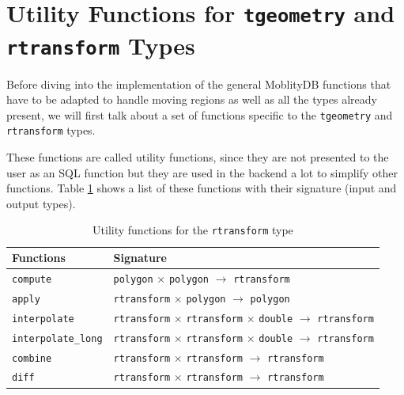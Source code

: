 
\section{Utility Functions for \texttt{tgeometry} and \texttt{rtransform} Types}
\label{section:utility_rtransform}

Before diving into the implementation of the general MoblityDB functions that have to be adapted to handle moving regions as well as all the types already present, we will first talk about a set of functions specific to the \lstinline{tgeometry} and \lstinline{rtransform} types.

These functions are called utility functions, since they are not presented to the user as an SQL function but they are used in the backend a lot to simplify other functions. Table \ref{table:rtransform_functions} shows a list of these functions with their signature (input and output types).

\begin{table}[h!]
    \centering
    \begin{tabular}[c]{|l|l|} 
    \hline
    \textbf{Functions}  & \textbf{Signature} \\ 
    \hline
    \lstinline+compute+ & \lstinline+polygon+ $\times$ \lstinline+polygon+ $\rightarrow$ \lstinline+rtransform+ \\
    \lstinline+apply+ & \lstinline+rtransform+ $\times$ \lstinline+polygon+ $\rightarrow$ \lstinline+polygon+ \\
    \hline
    \lstinline+interpolate+ & \lstinline+rtransform+ $\times$ \lstinline+rtransform+ $\times$ \lstinline+double+  $\rightarrow$ \lstinline+rtransform+ \\
    \lstinline+interpolate_long+ & \lstinline+rtransform+ $\times$ \lstinline+rtransform+ $\times$ \lstinline+double+  $\rightarrow$ \lstinline+rtransform+ \\
    \hline
    \lstinline+combine+ & \lstinline+rtransform+ $\times$ \lstinline+rtransform+ $\rightarrow$ \lstinline+rtransform+ \\
    \lstinline+diff+ & \lstinline+rtransform+ $\times$ \lstinline+rtransform+ $\rightarrow$ \lstinline+rtransform+ \\
    \hline
    \end{tabular}
    \caption{Utility functions for the \lstinline{rtransform} type}
    \label{table:rtransform_functions}
\end{table}


